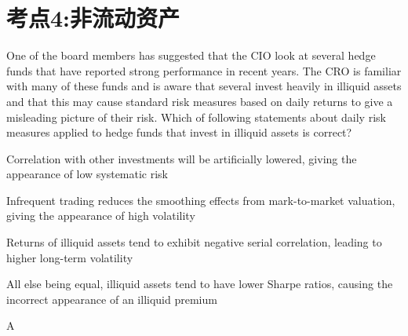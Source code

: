 \documentclass{article}
\newcounter{question} %
\begin{document}
\newpage




\section{考点4:非流动资产}
\setcounter{question}{0}


\begin{question}
    One of the board members has suggested that the CIO look at several hedge funds that have reported strong performance in recent years. The CRO is familiar with many of these funds and is aware that several invest heavily in illiquid assets and that this may cause standard risk measures based on daily returns to give a misleading picture of their risk. Which of following statements about daily risk measures applied to hedge funds that invest in illiquid assets is correct?
\end{question}

\begin{choices}
    \item Correlation with other investments will be artificially lowered, giving the appearance of low systematic risk
    \item Infrequent trading reduces the smoothing effects from mark-to-market valuation, giving the appearance of high volatility
    \item Returns of illiquid assets tend to exhibit negative serial correlation, leading to higher long-term volatility
    \item All else being equal, illiquid assets tend to have lower Sharpe ratios, causing the incorrect appearance of an illiquid premium
\end{choices}

\begin{correctanswer}
    A
\end{correctanswer}
\end{document}
